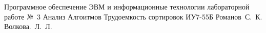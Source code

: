 \documentclass{bmstu}
\begin{document}
{Программное обеспечение ЭВМ и информационные технологии}
{лабораторной работе №~3}
{Анализ Алгоитмов}
{Трудоемкость сортировок}
{}
{ИУ7-55Б}
{Романов~С.~К.}
{Волкова.~Л.~Л.}

\tableofcontents









%

\makebibliography
\end{document}
